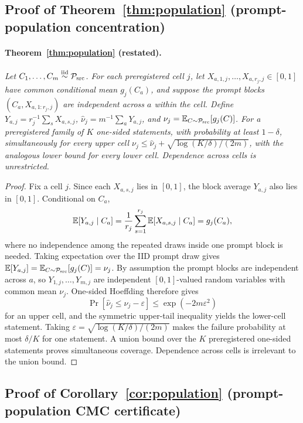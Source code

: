 \subsection{Proof of Theorem~\ref{thm:population} (prompt-population concentration)}
\label{app:proofs:population}

\paragraph{Theorem~\ref{thm:population} (restated).}
\emph{Let $C_1,\dots,C_m\stackrel{\mathrm{iid}}{\sim}\mathcal{P}_{\mathrm{src}}$. For each preregistered cell $j$,
let $X_{a,1,j},\dots,X_{a,r_j,j}\in[0,1]$ have common conditional mean $g_j(C_a)$, and suppose
the prompt blocks $(C_a,X_{a,1:r_j,j})$ are independent across $a$ within the cell. Define
$Y_{a,j}=r_j^{-1}\sum_sX_{a,s,j}$,
$\widehat\nu_j=m^{-1}\sum_aY_{a,j}$, and
$\nu_j=\mathbb{E}_{C\sim\mathcal{P}_{\mathrm{src}}}[g_j(C)]$. For a preregistered family of $K$ one-sided statements, with
probability at least $1-\delta$, simultaneously for every upper cell
$\nu_j\le\widehat\nu_j+\sqrt{\log(K/\delta)/(2m)}$, with the analogous lower bound for every
lower cell. Dependence across cells is unrestricted.}

\begin{proof}
Fix a cell $j$. Since each $X_{a,s,j}$ lies in $[0,1]$, the block average $Y_{a,j}$ also lies in
$[0,1]$. Conditional on $C_a$,
\[
\mathbb{E}[Y_{a,j}\mid C_a]
=\frac1{r_j}\sum_{s=1}^{r_j}\mathbb{E}[X_{a,s,j}\mid C_a]
=g_j(C_a),
\]
where no independence among the repeated draws inside one prompt block is needed. Taking expectation
over the IID prompt draw gives
$\mathbb{E}[Y_{a,j}]=\mathbb{E}_{C\sim\mathcal{P}_{\mathrm{src}}}[g_j(C)]=\nu_j$. By assumption the prompt blocks are independent
across $a$, so $Y_{1,j},\dots,Y_{m,j}$ are independent $[0,1]$-valued random variables with common
mean $\nu_j$. One-sided Hoeffding therefore gives
\[
\Pr\!\left[\widehat\nu_j\le\nu_j-\varepsilon\right]
\le \exp(-2m\varepsilon^2)
\]
for an upper cell, and the symmetric upper-tail inequality yields the lower-cell statement. Taking
$\varepsilon=\sqrt{\log(K/\delta)/(2m)}$ makes the failure probability at most $\delta/K$ for
one statement. A union bound over the $K$ preregistered one-sided statements proves simultaneous
coverage. Dependence across cells is irrelevant to the union bound.
\end{proof}

\subsection{Proof of Corollary~\ref{cor:population} (prompt-population CMC certificate)}
\label{app:proofs:population-cor}


